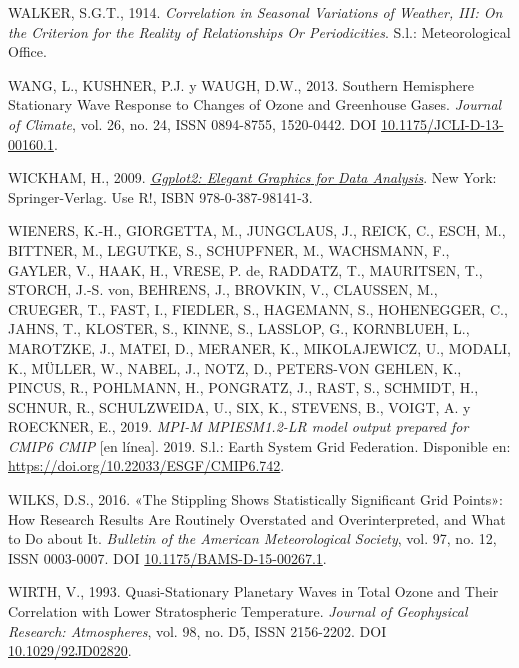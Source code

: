 \documentclass[12pt,oneside,a4paper]{reedthesis}
\newlength{\cslhangindent}
\newenvironment{CSLReferences}[2] %
 {%
  \setlength{\parindent}{0pt}
  \ifodd #1 \everypar{\setlength{\hangindent}{\cslhangindent}}\ignorespaces\fi
  \ifnum #2 > 0
  \setlength{\parskip}{#2\baselineskip}
  \fi
 }%
 {}
\begin{document}
\begin{CSLReferences}{1}{0}
\leavevmode{}%
WALKER, S.G.T., 1914. \emph{Correlation in {Seasonal Variations} of {Weather}, {III}: {On} the {Criterion} for the {Reality} of {Relationships Or Periodicities}}. S.l.: {Meteorological Office}.

\leavevmode{}%
WANG, L., KUSHNER, P.J. y WAUGH, D.W., 2013. Southern {Hemisphere Stationary Wave Response} to {Changes} of {Ozone} and {Greenhouse Gases}. \emph{Journal of Climate}, vol. 26, no. 24, ISSN 0894-8755, 1520-0442. DOI \href{https://doi.org/10.1175/JCLI-D-13-00160.1}{10.1175/JCLI-D-13-00160.1}.

\leavevmode{}%
WICKHAM, H., 2009. \emph{\href{https://doi.org/10.1007/978-0-387-98141-3}{Ggplot2: {Elegant Graphics} for {Data Analysis}}}. {New York}: {Springer-Verlag}. Use {R}!, ISBN 978-0-387-98141-3.

\leavevmode{}%
WIENERS, K.-H., GIORGETTA, M., JUNGCLAUS, J., REICK, C., ESCH, M., BITTNER, M., LEGUTKE, S., SCHUPFNER, M., WACHSMANN, F., GAYLER, V., HAAK, H., VRESE, P. de, RADDATZ, T., MAURITSEN, T., STORCH, J.-S. von, BEHRENS, J., BROVKIN, V., CLAUSSEN, M., CRUEGER, T., FAST, I., FIEDLER, S., HAGEMANN, S., HOHENEGGER, C., JAHNS, T., KLOSTER, S., KINNE, S., LASSLOP, G., KORNBLUEH, L., MAROTZKE, J., MATEI, D., MERANER, K., MIKOLAJEWICZ, U., MODALI, K., MÜLLER, W., NABEL, J., NOTZ, D., PETERS-VON GEHLEN, K., PINCUS, R., POHLMANN, H., PONGRATZ, J., RAST, S., SCHMIDT, H., SCHNUR, R., SCHULZWEIDA, U., SIX, K., STEVENS, B., VOIGT, A. y ROECKNER, E., 2019. \emph{MPI-M MPIESM1.2-LR model output prepared for CMIP6 CMIP} {[}en línea{]}. 2019. S.l.: Earth System Grid Federation. Disponible en: \url{https://doi.org/10.22033/ESGF/CMIP6.742}.

\leavevmode{}%
WILKS, D.S., 2016. {«{The Stippling Shows Statistically Significant Grid Points}»}: {How Research Results} Are {Routinely Overstated} and {Overinterpreted}, and {What} to {Do} about {It}. \emph{Bulletin of the American Meteorological Society}, vol. 97, no. 12, ISSN 0003-0007. DOI \href{https://doi.org/10.1175/BAMS-D-15-00267.1}{10.1175/BAMS-D-15-00267.1}.

\leavevmode{}%
WIRTH, V., 1993. Quasi-Stationary Planetary Waves in Total Ozone and Their Correlation with Lower Stratospheric Temperature. \emph{Journal of Geophysical Research: Atmospheres}, vol. 98, no. D5, ISSN 2156-2202. DOI \href{https://doi.org/10.1029/92JD02820}{10.1029/92JD02820}.


\end{CSLReferences}
\end{document}
